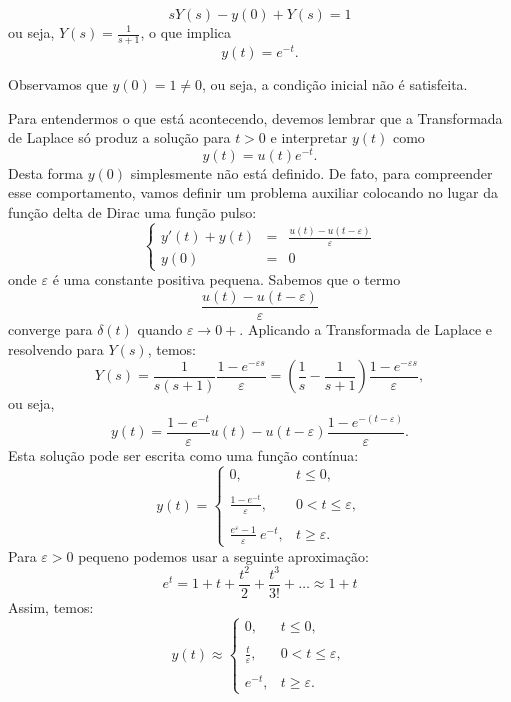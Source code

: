 \begin{equation*}
sY(s)-y(0)+Y(s)=1
\end{equation*}
ou seja, $Y(s)=\frac{1}{s+1}$, o que implica
$$y(t)=e^{-t}.$$

Observamos que $y(0)=1\neq 0$, ou seja, a condição inicial não é satisfeita.

Para entendermos o que está acontecendo, devemos lembrar que a Transformada de Laplace só produz a solução para $t>0$ e interpretar $y(t)$ como
$$y(t)=u(t)e^{-t}.$$
Desta forma $y(0)$ simplesmente não está definido. De fato, para compreender esse comportamento, vamos definir um problema auxiliar colocando no lugar da função delta de Dirac uma função pulso:
\begin{equation*}
\left\{
\begin{array}{rcl}
y'(t)+y(t)&=&\frac{u(t)-u(t-\varepsilon)}{\varepsilon}\\
y(0)&=&0
\end{array}
\right.
\end{equation*}
onde $\varepsilon$ é uma constante positiva pequena. Sabemos que o termo $$\frac{u(t)-u(t-\varepsilon)}{\varepsilon}$$ converge para $\delta(t)$ quando $\varepsilon \to 0+$. Aplicando a Transformada de Laplace e resolvendo para $Y(s)$, temos:
$$Y(s)=\frac{1}{s(s+1)}\frac{1-e^{-\varepsilon s}}{\varepsilon}=\left(\frac{1}{s}-\frac{1}{s+1}\right)\frac{1-e^{-\varepsilon s}}{\varepsilon},$$
ou seja,
$$y(t)=\frac{1-e^{-t}}{\varepsilon}u(t)-u(t-\varepsilon)\frac{1-e^{-(t-\varepsilon)}}{\varepsilon}.$$
Esta solução pode ser escrita como uma função contínua:
$$y(t)=\left\{\begin{array}{ll}
0,&t\leq 0,\\~\\
\frac{1-e^{-t}}{\varepsilon},&0<t\leq \varepsilon,\\~\\
\frac{e^{\varepsilon}-1}{\varepsilon}~\!
e^{-t},&t\geq \varepsilon.
\end{array}
\right.$$
Para $\varepsilon>0$ pequeno podemos usar a seguinte aproximação:
$$e^t=1+t+\frac{t^2}{2}+\frac{t^3}{3!}+\ldots \approx 1+t$$
Assim, temos:
$$y(t)\approx\left\{\begin{array}{ll}
0,&t\leq 0,\\~\\
\frac{t}{\varepsilon},&0<t\leq \varepsilon,\\~\\
e^{-t},&t\geq \varepsilon.
\end{array}
\right.$$

